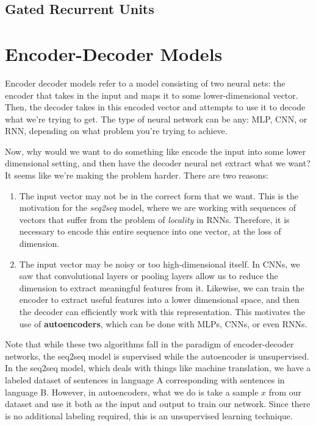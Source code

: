 \documentclass{article}
\begin{document}
    \subsection{Gated Recurrent Units}

\section{Encoder-Decoder Models}

  Encoder decoder models refer to a model consisting of two neural nets: the encoder that takes in the input and maps it to some lower-dimensional vector. Then, the decoder takes in this encoded vector and attempts to use it to decode what we're trying to get. The type of neural network can be any: MLP, CNN, or RNN, depending on what problem you're trying to achieve. 

  Now, why would we want to do something like encode the input into some lower dimensional setting, and then have the decoder neural net extract what we want? It seems like we're making the problem harder. There are two reasons: 
  \begin{enumerate}
    \item The input vector may not be in the correct form that we want. This is the motivation for the \textit{seq2seq} model, where we are working with sequences of vectors that suffer from the problem of \textit{locality} in RNNs. Therefore, it is necessary to encode this entire sequence into one vector, at the loss of dimension. 

    \item The input vector may be noisy or too high-dimensional itself. In CNNs, we saw that convolutional layers or pooling layers allow us to reduce the dimension to extract meaningful features from it. Likewise, we can train the encoder to extract useful features into a lower dimensional space, and then the decoder can efficiently work with this representation. This motivates the use of \textbf{autoencoders}, which can be done with MLPs, CNNs, or even RNNs. 
  \end{enumerate}

  Note that while these two algorithms fall in the paradigm of encoder-decoder networks, the seq2seq model is supervised while the autoencoder is unsupervised. In the seq2seq model, which deals with things like machine translation, we have a labeled dataset of sentences in language A corresponding with sentences in language B. However, in autoencoders, what we do is take a sample $x$ from our dataset and use it both as the input and output to train our network. Since there is no additional labeling required, this is an unsupervised learning technique. 
\end{document}
